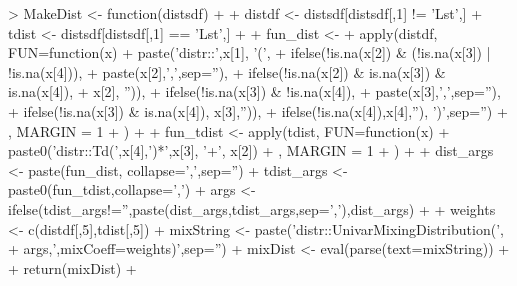 \documentclass[11pt,notitlepage]{isuthesis}
\begin{document}
\begin{Schunk}
\begin{Sinput}
> MakeDist <- function(distsdf){
+   
+   distdf <- distsdf[distsdf[,1] != 'Lst',]
+   tdist <- distsdf[distsdf[,1] == 'Lst',]
+   
+   fun_dist <- 
+     apply(distdf, FUN=function(x) {
+       paste('distr::',x[1], '(', 
+             ifelse(!is.na(x[2]) & (!is.na(x[3]) | !is.na(x[4])),
+                    paste(x[2],',',sep=''),
+                    ifelse(!is.na(x[2]) & is.na(x[3]) & is.na(x[4]),
+                           x[2], '')), 
+             ifelse(!is.na(x[3]) & !is.na(x[4]),
+                    paste(x[3],',',sep=''),
+                    ifelse(!is.na(x[3]) & is.na(x[4]), x[3],'')), 
+             ifelse(!is.na(x[4]),x[4],''), ')',sep='')
+     }, MARGIN = 1
+     )
+   
+   fun_tdist <- apply(tdist, FUN=function(x) {
+     paste0('distr::Td(',x[4],')*',x[3], '+', x[2])
+   }, MARGIN = 1
+   )
+   
+   dist_args <- paste(fun_dist, collapse=',',sep='')
+   tdist_args <- paste0(fun_tdist,collapse=',')
+   args <- ifelse(tdist_args!='',paste(dist_args,tdist_args,sep=','),dist_args)
+   
+   weights <- c(distdf[,5],tdist[,5])
+   mixString <- paste('distr::UnivarMixingDistribution(',
+                      args,',mixCoeff=weights)',sep='')
+   mixDist <- eval(parse(text=mixString))
+   
+   return(mixDist)
+ }
\end{Sinput}
\end{Schunk}
\end{document}
